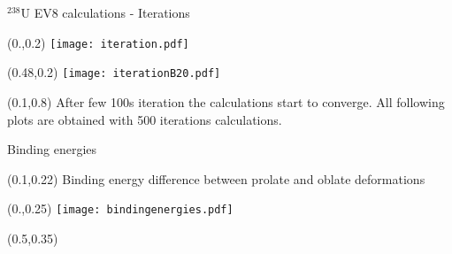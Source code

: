 \documentclass[10pt,aspectratio=169]{beamer}
\begin{document}
\begin{frame}{$^{238}$U EV8 calculations - Iterations}
    \centering 
    \begin{textblock*}{0.5\paperwidth}(0.\paperwidth,0.2\paperheight)
        \centering
        \texttt{[image: iteration.pdf]}
    \end{textblock*}
    \begin{textblock*}{0.5\paperwidth}(0.48\paperwidth,0.2\paperheight)
        \centering
        \texttt{[image: iterationB20.pdf]}
    \end{textblock*}
    \begin{textblock*}{0.8\paperwidth}(0.1\paperwidth,0.8\paperheight)
        \centering
        After few 100s iteration the calculations start to converge. All following plots are obtained with 500 iterations calculations.
    \end{textblock*}
\end{frame}

\begin{frame}{Binding energies}

    \centering 
    \begin{textblock*}{0.8\paperwidth}(0.1\paperwidth,0.22\paperheight)
        \centering
        Binding energy difference between prolate and oblate deformations
    \end{textblock*}
    \begin{textblock*}{0.5\paperwidth}(0.\paperwidth,0.25\paperheight)
        \centering
        \texttt{[image: bindingenergies.pdf]}
    \end{textblock*}
    \begin{textblock*}{0.45\paperwidth}(0.5\paperwidth,0.35\paperheight)
    \end{textblock*}
\end{frame}
\end{document}
